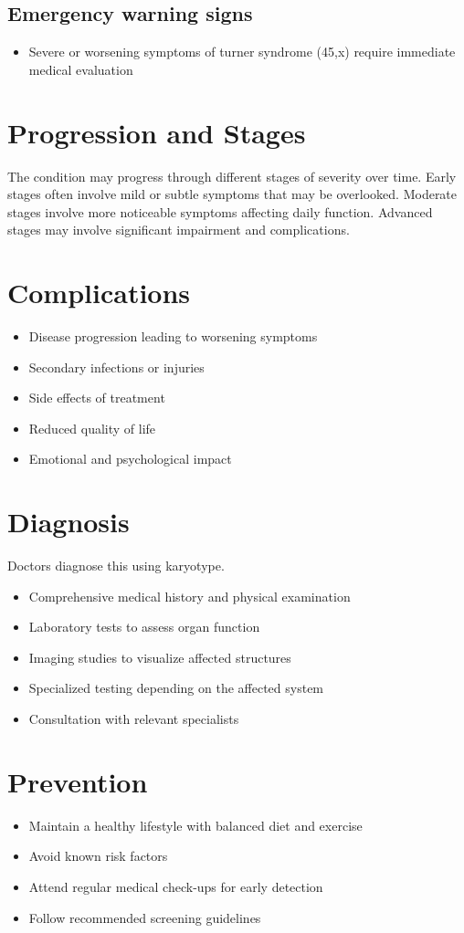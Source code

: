 \subsection{Emergency warning signs}
\begin{itemize}[noitemsep]
  \item Severe or worsening symptoms of turner syndrome (45,x) require immediate medical evaluation
\end{itemize}
\section{Progression and Stages}
The condition may progress through different stages of severity over time. Early stages often involve mild or subtle symptoms that may be overlooked. Moderate stages involve more noticeable symptoms affecting daily function. Advanced stages may involve significant impairment and complications.
\section{Complications}
\begin{itemize}[noitemsep]
  \item Disease progression leading to worsening symptoms
  \item Secondary infections or injuries
  \item Side effects of treatment
  \item Reduced quality of life
  \item Emotional and psychological impact
\end{itemize}
\section{Diagnosis}
Doctors diagnose this using karyotype.

\begin{itemize}[noitemsep]
  \item Comprehensive medical history and physical examination
  \item Laboratory tests to assess organ function
  \item Imaging studies to visualize affected structures
  \item Specialized testing depending on the affected system
  \item Consultation with relevant specialists
\end{itemize}
\section{Prevention}
\begin{itemize}[noitemsep]
  \item Maintain a healthy lifestyle with balanced diet and exercise
  \item Avoid known risk factors
  \item Attend regular medical check-ups for early detection
  \item Follow recommended screening guidelines
\end{itemize}
